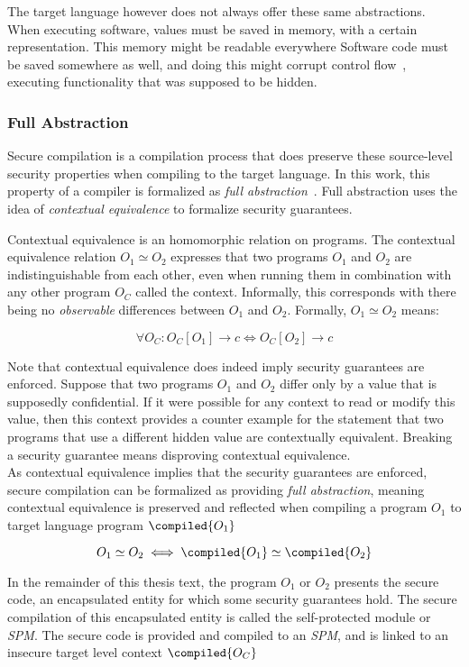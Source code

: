 The target language however does not always offer these same abstractions.
When executing software, values must be saved in memory, with a certain representation.
This memory might be readable everywhere
Software code must be saved somewhere as well, and doing this might corrupt control flow~\cite{OVSPaper}, executing functionality that was supposed to be hidden.

\subsubsection{Full Abstraction}
\label{sec:fullabstraction}
Secure compilation is a compilation process that does preserve these source-level security properties when compiling to the target language.
In this work, this property of a compiler is formalized as \emph{full abstraction}~\cite{Abadi}.
Full abstraction uses the idea of \emph{contextual equivalence} to formalize security guarantees.

Contextual equivalence is an homomorphic relation on programs.
The contextual equivalence relation $O_{1} \simeq O_{2}$ expresses that two programs $O_1$ and $O_2$ are indistinguishable from each other, even when running them in combination with any other program $O_C$ called the context.
Informally, this corresponds with there being no \emph{observable} differences between $O_1$ and $O_2$.
Formally, $O_{1} \simeq O_{2}$ means:

\[
    \forall O_C : O_C[O_{1}] \rightarrow c \iff O_C[O_{2}] \rightarrow c
\]

Note that contextual equivalence does indeed imply security guarantees are enforced.
Suppose that two programs $O_1$ and $O_2$ differ only by a value that is supposedly confidential.
If it were possible for any context to read or modify this value, then this context provides a counter example for the statement that two programs that use a different hidden value are contextually equivalent.
Breaking a security guarantee means disproving contextual equivalence.
\\[1em]
As contextual equivalence implies that the security guarantees are enforced, secure compilation can be formalized as providing \emph{full abstraction}, meaning contextual equivalence is preserved and reflected when compiling a program $O_1$ to target language program $\compiled{O_1}$

\[
    O_{1} \simeq O_{2} \iff \compiled{O_{1}} \simeq \compiled{O_{2}}
\]

In the remainder of this thesis text, the program $O_1$ or $O_2$ presents the secure code, an encapsulated entity for which some security guarantees hold.
The secure compilation of this encapsulated entity is called the self-protected module or \emph{SPM}.
The secure code is provided and compiled to an \emph{SPM}, and is linked to an insecure target level context $\compiled{O_C}$

